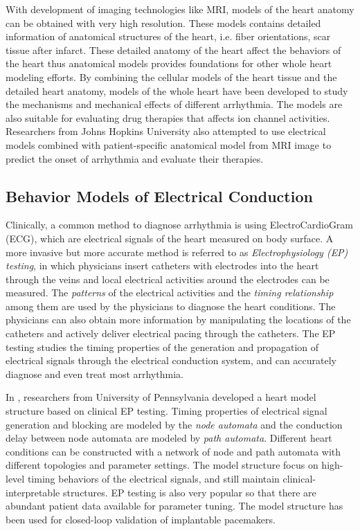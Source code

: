 With development of imaging technologies like MRI, models of the heart anatomy can be obtained with very high resolution. These models contains detailed information of anatomical structures of the heart, i.e. fiber orientations, scar tissue after infarct. These detailed anatomy of the heart affect the behaviors of the heart thus anatomical models provides foundations for other whole heart modeling efforts. By combining the cellular models of the heart tissue and the detailed heart anatomy, models of the whole heart have been developed to study the mechanisms and mechanical effects of different arrhythmia. The models are also suitable for evaluating drug therapies that affects ion channel activities. Researchers from Johns Hopkins University also attempted to use electrical models combined with patient-specific anatomical model from MRI image to predict the onset of arrhythmia and evaluate their therapies.
\subsection{Behavior Models of Electrical Conduction}
Clinically, a common method to diagnose arrhythmia is using ElectroCardioGram (ECG), which are electrical signals of the heart measured on body surface. A more invasive but more accurate method is referred to as \emph{Electrophysiology (EP) testing}, in which physicians insert catheters with electrodes into the heart through the veins and local electrical activities around the electrodes can be measured. The \emph{patterns} of the electrical activities and the \emph{timing relationship} among them are used by the physicians to diagnose the heart conditions. The physicians can also obtain more information by manipulating the locations of the catheters and actively deliver electrical pacing through the catheters. The EP testing studies the timing properties of the generation and propagation of electrical signals through the electrical conduction system, and can accurately diagnose and even treat most arrhythmia. 

In \cite{VHM_proc}, researchers from University of Pennsylvania developed a heart model structure based on clinical EP testing. Timing properties of electrical signal generation and blocking are modeled by the \emph{node automata} and the conduction delay between node automata are modeled by \emph{path automata}. Different heart conditions can be constructed with a network of node and path automata with different topologies and parameter settings. The model structure focus on high-level timing behaviors of the electrical signals, and still maintain clinical-interpretable structures. EP testing is also very popular so that there are abundant patient data available for parameter tuning. The model structure has been used for closed-loop validation of implantable pacemakers. %


